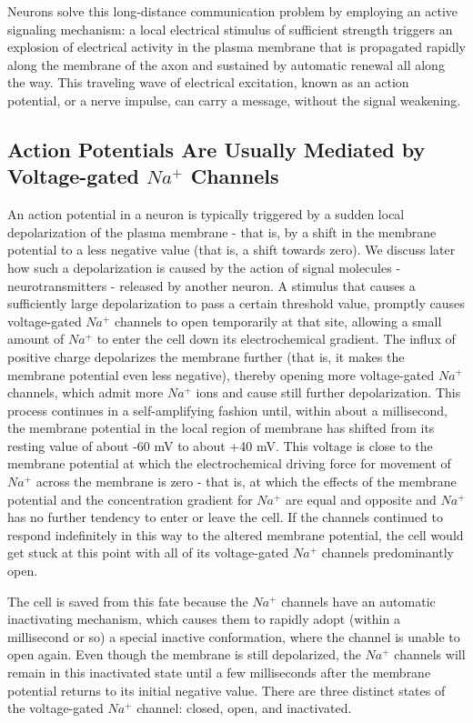 Neurons solve this long-distance communication problem by employing
an active signaling mechanism: a local electrical stimulus of sufficient
strength triggers an explosion of electrical activity in the plasma membrane
that is propagated rapidly along the membrane of the axon and
sustained by automatic renewal all along the way. This traveling wave of
electrical excitation, known as an action potential, or a nerve impulse,
can carry a message, without the signal weakening.

\subsection{Action Potentials Are Usually Mediated by Voltage-gated $Na^{+}$ Channels}

An action potential in a neuron is typically triggered by a sudden local
depolarization of the plasma membrane - that is, by a shift in the membrane
potential to a less negative value (that is, a shift towards zero). We
discuss later how such a depolarization is caused by the action of signal
molecules - neurotransmitters - released by another neuron. A stimulus
that causes a sufficiently large depolarization to pass a certain threshold
value, promptly causes voltage-gated $Na^{+}$ channels to open temporarily
at that site, allowing a small amount of $Na^{+}$ to enter the cell down
its electrochemical gradient. The influx of positive charge depolarizes
the membrane further (that is, it makes the membrane potential even
less negative), thereby opening more voltage-gated $Na^{+}$ channels, which
admit more $Na^{+}$ ions and cause still further depolarization. This process
continues in a self-amplifying fashion until, within about a millisecond,
the membrane potential in the local region of membrane has shifted from
its resting value of about -60 mV to about +40 mV. This
voltage is close to the membrane potential at which the electrochemical
driving force for movement of $Na^{+}$ across the membrane is zero - that
is, at which the effects of the membrane potential and the concentration
gradient for $Na^{+}$ are equal and opposite and $Na^{+}$ has no further tendency
to enter or leave the cell. If the channels continued to respond indefinitely
in this way to the altered membrane potential, the cell would get stuck
at this point with all of its voltage-gated $Na^{+}$ channels predominantly
open.

The cell is saved from this fate because the $Na^{+}$ channels have an automatic
inactivating mechanism, which causes them to rapidly adopt
(within a millisecond or so) a special inactive conformation, where the
channel is unable to open again. Even though the membrane is still depolarized,
the $Na^{+}$ channels will remain in this inactivated state until a few
milliseconds after the membrane potential returns to its initial negative
value. There are three distinct states of the voltage-gated
$Na^{+}$ channel: closed, open, and inactivated.


